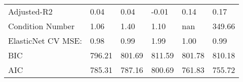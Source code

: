 \begin{table}
\begin{center}
\begin{tabular}{llllll}
Adjusted-R2                                    & 0.04    & 0.04    & -0.01  & 0.14    & 0.17      \\
Condition Number                               & 1.06    & 1.40    & 1.10   & nan     & 349.66    \\
ElasticNet CV MSE:                             & 0.98    & 0.99    & 1.99   & 1.00    & 0.99      \\
BIC                                            & 796.21  & 801.69  & 811.59 & 801.78  & 810.18    \\
AIC                                            & 785.31  & 787.16  & 800.69 & 761.83  & 755.72    \\
\hline
\end{tabular}
\end{center}
\end{table}